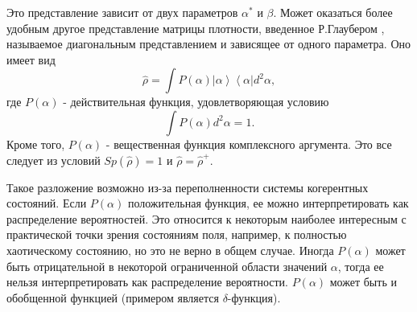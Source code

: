 Это представление зависит от двух параметров $\alpha^{*}$ и $\beta$.
Может оказаться более удобным другое представление матрицы плотности,
введенное Р.Глаубером \cite{bQuantumOpticsAndRadioPhisicsLecture1966},
называемое 
диагональным представлением и зависящее от одного параметра. Оно имеет
вид  
\begin{equation}
\hat{\rho} = \int
P\left(\alpha\right)\left|\alpha\right>\left<\alpha\right| d^2 \alpha,
\label{eqCh1_rhorepresent}
\end{equation}
где  $P\left(\alpha\right)$ -  действительная функция,
удовлетворяющая условию 
\[
\int
P\left(\alpha\right) d^2 \alpha = 1.
\]
Кроме того, $P\left(\alpha\right)$ - вещественная функция комплексного
аргумента. Это все следует из условий  $Sp\left(\hat{\rho}\right) = 1$
и  $\hat{\rho} = \hat{\rho}^{+}$.
  
Такое разложение возможно из-за переполненности системы когерентных
состояний. Если   $P\left(\alpha\right)$  положительная функция, ее
можно интерпретировать 
как распределение вероятностей. Это относится к некоторым наиболее
интересным с практической точки зрения состояниям поля, например, к
полностью хаотическому состоянию, но это не верно в общем
случае. Иногда   $P\left(\alpha\right)$  может быть отрицательной в
некоторой ограниченной области значений $\alpha$,  тогда ее нельзя интерпретировать как
распределение вероятности.   $P\left(\alpha\right)$  может быть и обобщенной функцией
(примером является $\delta$-функция). 

